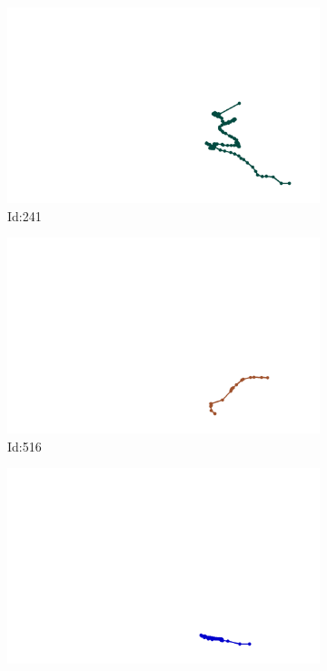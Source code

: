 \documentclass[12pt,twoside]{report}
\begin{document}
\begin{figure}
\centering
\begin{subfigure}[b]{0.20\textwidth}
\centering
\includegraphics[width=\textwidth]{../../trajectories/241.png}
\caption{Id:241}
\end{subfigure}
\begin{subfigure}[b]{0.20\textwidth}
\centering
\includegraphics[width=\textwidth]{../../trajectories/516.png}
\caption{Id:516}
\end{subfigure}
\begin{subfigure}[b]{0.20\textwidth}
\centering
\includegraphics[width=\textwidth]{../../trajectories/539.png}

\end{subfigure}
\end{figure}
\end{document}
